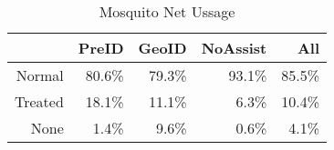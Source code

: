 \begin{table}[ht]
\centering
\begin{tabular}{rrrrr}
  \hline
 & PreID & GeoID & NoAssist & All \\ 
  \hline
Normal & 80.6\% & 79.3\% & 93.1\% & 85.5\% \\ 
  Treated & 18.1\% & 11.1\% & 6.3\% & 10.4\% \\ 
  None & 1.4\% & 9.6\% & 0.6\% & 4.1\% \\ 
   \hline
\end{tabular}
\caption{Mosquito Net Ussage} 
\end{table}
